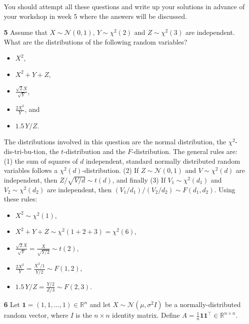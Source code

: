 \documentclass[
  a4paper,
]{article}
\theoremstyle{definition}
\theoremstyle{definition}
\theoremstyle{definition}
\theoremstyle{definition}
\theoremstyle{remark}
\begin{document}
You should attempt all these questions and write up your solutions in advance
of your workshop in week 5 where the answers will be discussed.

\textbf{5} Assume that \(X \sim \mathcal{N}(0, 1)\), \(Y\sim \chi^2(2)\) and
\(Z \sim \chi^2(3)\) are independent. What are the distributions of
the following random variables?

\begin{itemize}
\item
  \(X^2\),
\item
  \(X^2 + Y + Z\),
\item
  \(\displaystyle \frac{\sqrt{2}X}{\sqrt{Y}}\),
\item
  \(\displaystyle \frac{2X^2}{Y}\), and
\item
  \(1.5\, Y/Z\).
\end{itemize}

\begin{myanswers}

The distributions involved in this question are the normal
distribution, the \(\chi^2\)-dis-tri-bu-tion, the \(t\)-distribution
and the \(F\)-distribution. The general rules are: (1) the sum of
squares of \(d\) independent, standard normally distributed random
variables follows a \(\chi^2(d)\)-distribution. (2) If
\(Z\sim\mathcal{N}(0,1)\) and \(V \sim \chi^2(d)\) are independent, then
\(Z / \sqrt{V / d} \sim t(d)\), and finally (3) If
\(V_1\sim \chi^2(d_1)\) and \(V_2\sim \chi^2(d_2)\) are independent,
then \((V_1/d_1)/(V_2/d_2) \sim F(d_1, d_2)\). Using these rules:

\begin{itemize}
\item
  \(X^2 \sim \chi^2(1)\),
\item
  \(X^2 + Y + Z \sim \chi^2(1+2+3) = \chi^2(6)\),
\item
  \(\displaystyle \frac{\sqrt{2}X}{\sqrt{Y}} = \frac{X}{\sqrt{Y/2}} \sim t(2)\),
\item
  \(\displaystyle \frac{2X^2}{Y} = \frac{X^2/1}{Y/2} \sim F(1,2)\),
\item
  \(\displaystyle 1.5\, Y/Z = \frac{Y/2}{Z/3} \sim F(2, 3)\).
\end{itemize}

\end{myanswers}

\textbf{6} Let \(\mathbf{1} = (1, 1, \ldots, 1) \in\mathbb{R}^n\) and let \(X \sim \mathcal{N}(\mu, \sigma^2 I)\) be a normally-distributed random vector, where \(I\) is the
\(n\times n\) identity matrix. Define \(A = \frac1n \mathbf{1} \mathbf{1}^\top \in \mathbb{R}^{n\times n}\).
\end{document}

